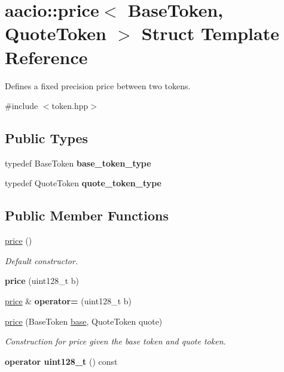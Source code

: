\hypertarget{structaacio_1_1price}{}\section{aacio\+:\+:price$<$ Base\+Token, Quote\+Token $>$ Struct Template Reference}
\label{structaacio_1_1price}


Defines a fixed precision price between two tokens.  




{\ttfamily \#include $<$token.\+hpp$>$}

\subsection*{Public Types}
\begin{DoxyCompactItemize}
\item 
\mbox{\label{structaacio_1_1price_aa6f44e2105843de519d9432254358495}} 
typedef Base\+Token {\bfseries base\+\_\+token\+\_\+type}
\item 
\mbox{\label{structaacio_1_1price_a7fadbafc43cb1d2bcc31f9750732a43b}} 
typedef Quote\+Token {\bfseries quote\+\_\+token\+\_\+type}
\end{DoxyCompactItemize}
\subsection*{Public Member Functions}
\begin{DoxyCompactItemize}
\item 
\mbox{\hyperlink{structaacio_1_1price_a007442872d7ce6ff85932b8dcb2d3524}{price}} ()
\begin{DoxyCompactList}\small\item\em Default constructor. \end{DoxyCompactList}\item 
\mbox{\label{structaacio_1_1price_a117db4c67fe55ce99bd6d336a6e29bc7}} 
{\bfseries price} (uint128\+\_\+t b)
\item 
\mbox{\label{structaacio_1_1price_a7accca163f355c49544dff27abd81d46}} 
\mbox{\hyperlink{structaacio_1_1price}{price}} \& {\bfseries operator=} (uint128\+\_\+t b)
\item 
\mbox{\hyperlink{structaacio_1_1price_abb8106fce4e7e287befe8e309abbb544}{price}} (Base\+Token \mbox{\hyperlink{structbase}{base}}, Quote\+Token quote)
\begin{DoxyCompactList}\small\item\em Construction for price given the base token and quote token. \end{DoxyCompactList}\item 
\mbox{\label{structaacio_1_1price_af32ed949e6f9faa2ee5bc690c8a77d77}} 
{\bfseries operator uint128\+\_\+t} () const
\end{DoxyCompactItemize}
